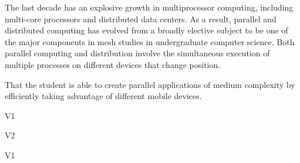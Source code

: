 \begin{syllabus}


\begin{justification}
The last decade has an explosive growth in multiprocessor computing, including multi-core processors and distributed data centers. As a result, parallel and distributed computing has evolved from a broadly elective subject to be one of the major components in mesh studies in undergraduate computer science.
Both parallel computing and distribution involve the simultaneous execution of multiple processes on different devices that change position.
\end{justification}

\begin{goals}
\item That the student is able to create parallel applications of medium complexity by efficiently taking advantage of different mobile devices.
\end{goals}

\begin{outcomes}{V1}
    \item {} 
    \item {}
    \item {}
    \item {}
\end{outcomes}

\begin{outcomes}{V2}
    \item {} 
    \item {}
    \item {}
\end{outcomes}

\begin{competences}{V1}
    \item {}
    \item {}
    \item {}
    \item {}
    \item {}
    \item {} 	
\end{competences}


\end{syllabus}
